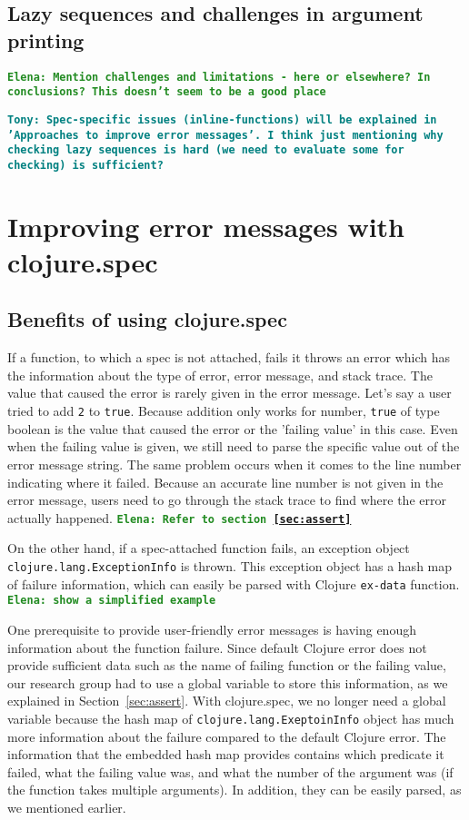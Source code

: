 \documentclass[12pt]{article}
\newcommand{\comment}[1]{{\bf \tt  {#1}}}
\newcommand{\emcomment}[1]{\textcolor{ForestGreen}{\comment{Elena: {#1}}}}
\newcommand{\tscomment}[1]{\textcolor{Teal}{\comment{Tony: {#1}}}}
\begin{document}
\subsection{Lazy sequences and challenges in argument printing}



\emcomment{Mention challenges and limitations - here or elsewhere? In conclusions? 
This doesn't seem to be a good place}

\tscomment{Spec-specific issues (inline-functions) will be explained in 'Approaches to improve error messages'. I think 
just mentioning why checking lazy sequences is hard (we need to evaluate some for checking) is sufficient?}

\section{Improving error messages with clojure.spec}
	\subsection{Benefits of using clojure.spec}
	If a function, to which a spec is not attached, fails 
	it throws an error which has the information about the type of error, error message, and stack 
	trace. The value that caused the error is rarely given in the error message.
	Let's say a user tried to add {\tt 2} to {\tt true}. Because addition only works for number, 
	{\tt true} of type boolean is the value that caused the error or the 'failing value' in this case.
	Even when the failing value is given, we still need to parse the specific value out of 
	the error message string. The same problem occurs when it comes to the line number indicating where it failed. 
	Because an accurate line number is not given in the error message, users need to go through the stack trace to find 
	where the error actually happened. 
	\emcomment{Refer to section~\ref{sec:assert}}

	On the other hand, if a spec-attached function fails, an exception object 
	\newline	
	{\tt clojure.lang.ExceptionInfo} is thrown. 
	This exception object has a hash map of failure information, which can easily be 
	parsed with Clojure {\tt ex-data} function. 
	\emcomment{show a simplified example}

	One prerequisite to provide user-friendly error messages is having enough information about the function failure. Since 
	default Clojure error does not provide sufficient data such as the name of failing function or the failing value, our 
	research group had to use a global variable to store this information, as we explained in Section~\ref{sec:assert}. 
	With clojure.spec, we no longer need a global variable because the hash map of {\tt clojure.lang.ExeptoinInfo} object 
	has much more information about the 
	failure compared to the default Clojure error. The information that the embedded hash map provides contains which predicate it 
	failed, what the failing value was, and what the number of the argument was (if the function takes multiple arguments). 
	In addition, they can be easily parsed, as we mentioned earlier.
	
\end{document}
